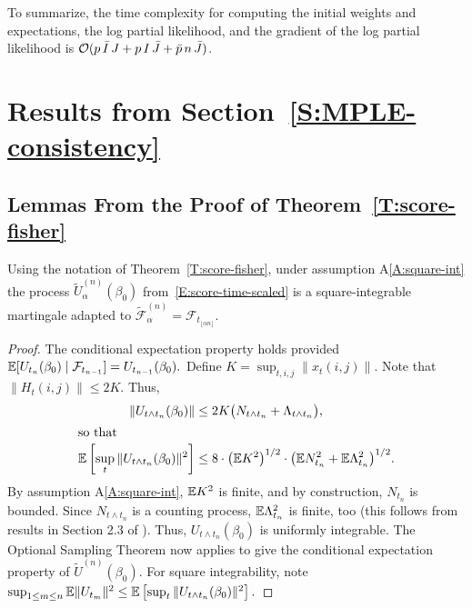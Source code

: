 \documentclass[final]{statsoc}
\begin{document}
To summarize, the time complexity for computing the initial weights and
expectations, the log partial likelihood, and the gradient of the log partial
likelihood is
$\mathcal{O}(p \, \bar I \, J + p \, I \, \bar J + \bar p \, n \, \bar J)$.


\newcommand{\MPLEconsistencysection}{\ref{S:MPLE-consistency}}
\section{Results from Section~\protect\MPLEconsistencysection{}}
\label{S:MPLE-consistency-proofs}

\subsection{Lemmas From the Proof of Theorem~\ref{T:score-fisher}}

\begin{lemma}\label{L:adapted-martingale}
Using the notation of Theorem~\ref{T:score-fisher}, under assumption
A\ref{A:square-int} the process $\tilde U_\alpha^{(n)}(\beta_0)$
from~\eqref{E:score-time-scaled} is a square-integrable martingale adapted to
\(
    \mathcal{\tilde F}^{(n)}_\alpha
        =
        \mathcal{F}_{t_{\lfloor \alpha n \rfloor}}.
\)
\end{lemma}

\begin{proof}
The conditional expectation property holds provided
\(
    \mathbb{E}[ U_{t_{n}}(\beta_0) \mid \mathcal{F}_{t_{n-1}} ]
        = U_{t_{n-1}}(\beta_0).
\)
Define $K = \sup_{t,i,j} \| x_{t}(i,j) \|$.
Note that $\|H_{t}(i,j)\| \leq 2 K$.  Thus,
\begin{align*}
    \| U_{t \wedge t_n} (\beta_0) \|
        &\leq
            2 K
            \big(
                N_{t \wedge t_n}
                +
                \Lambda_{t \wedge t_n}
            \big), \\
\intertext{so that}
    \mathbb{E} \left[
        \sup_t
        \| U_{t \wedge t_n} (\beta_0) \|^2
    \right]
        &\leq
            8 \cdot \big(\mathbb{E} K^2\big)^{1/2} \cdot
            \big(
              \mathbb{E} N_{t_n}^2
              +
              \mathbb{E} \Lambda_{t_n}^2
            \big)^{1/2}.
\end{align*}
By assumption A\ref{A:square-int}, $\mathbb{E} K^2$ is finite, and by construction,
$N_{t_n}$ is bounded.  Since $N_{t \wedge t_n}$ is a counting process,
$\mathbb{E} \Lambda_{t_n}^2$ is finite, too
(this follows from results in Section 2.3 of
\citet{fleming1991counting}).  Thus, $U_{t \wedge t_n}(\beta_0)$
is uniformly integrable.  The Optional Sampling Theorem now applies to
give the conditional expectation property of $\tilde U^{(n)}(\beta_0)$.  For
square integrability, note
\(
    \sup_{1 \leq m \leq n}
    \mathbb{E} \| U_{t_m} \|^2
        \leq
        \mathbb{E} \left[
           \sup_t
           \| U_{t \wedge t_n} (\beta_0) \|^2
        \right].
\)
\end{proof}
\end{document}
